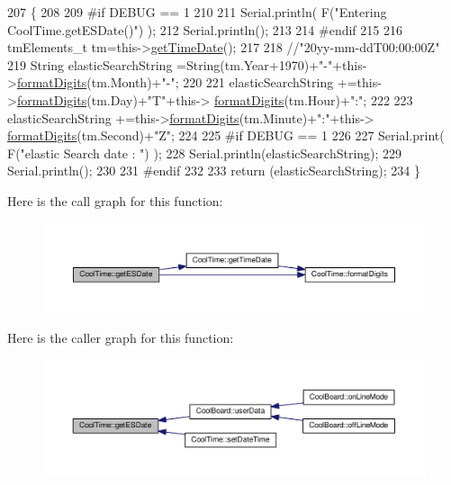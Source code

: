 \begin{DoxyCode}
207 \{
208 
209 \textcolor{preprocessor}{#if DEBUG == 1 }
210 
211     Serial.println( F(\textcolor{stringliteral}{"Entering CoolTime.getESDate()"}) );
212     Serial.println();
213 
214 \textcolor{preprocessor}{#endif }
215 
216     tmElements\_t tm=this->\hyperlink{class_cool_time_a7a7501c5ca77dd1248bea704c44f986c}{getTimeDate}();
217 
218     \textcolor{comment}{//"20yy-mm-ddT00:00:00Z"}
219     String elasticSearchString =String(tm.Year+1970)+\textcolor{stringliteral}{"-"}+this->\hyperlink{class_cool_time_acd537cd4210d7bde4e1f5c47d2ac0456}{formatDigits}(tm.Month)+\textcolor{stringliteral}{"-"};
220 
221     elasticSearchString +=this->\hyperlink{class_cool_time_acd537cd4210d7bde4e1f5c47d2ac0456}{formatDigits}(tm.Day)+\textcolor{stringliteral}{"T"}+this->
      \hyperlink{class_cool_time_acd537cd4210d7bde4e1f5c47d2ac0456}{formatDigits}(tm.Hour)+\textcolor{stringliteral}{":"};
222     
223     elasticSearchString +=this->\hyperlink{class_cool_time_acd537cd4210d7bde4e1f5c47d2ac0456}{formatDigits}(tm.Minute)+\textcolor{stringliteral}{":"}+this->
      \hyperlink{class_cool_time_acd537cd4210d7bde4e1f5c47d2ac0456}{formatDigits}(tm.Second)+\textcolor{stringliteral}{"Z"};
224 
225 \textcolor{preprocessor}{#if DEBUG == 1 }
226 
227     Serial.print( F(\textcolor{stringliteral}{"elastic Search date : "}) );
228     Serial.println(elasticSearchString);
229     Serial.println();
230 
231 \textcolor{preprocessor}{#endif}
232 
233     \textcolor{keywordflow}{return} (elasticSearchString);
234 \}
\end{DoxyCode}
Here is the call graph for this function\+:\nopagebreak
\begin{figure}[H]
\begin{center}
\leavevmode
\includegraphics[width=350pt]{d6/d49/class_cool_time_ac4f32ee513c1328d984306645e8785a4_cgraph}
\end{center}
\end{figure}
Here is the caller graph for this function\+:\nopagebreak
\begin{figure}[H]
\begin{center}
\leavevmode
\includegraphics[width=350pt]{d6/d49/class_cool_time_ac4f32ee513c1328d984306645e8785a4_icgraph}
\end{center}
\end{figure}
